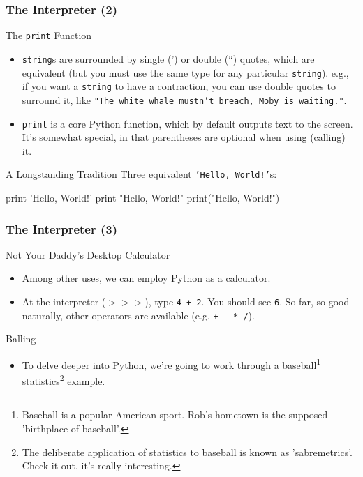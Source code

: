 \documentclass[10pt]{beamer}
\begin{document}
\begin{frame}[fragile]
  \frametitle{The Interpreter (2)}
  \begin{block}{The \texttt{print} Function}
    \begin{itemize}
      \item \texttt{string}s are surrounded by single (') or double (``) quotes, which are equivalent (but you must use the same type for any particular \texttt{string}).
        e.g., if you want a \texttt{string} to have a contraction, you can use double quotes to surround it, like \texttt{"The white whale mustn't breach, Moby is waiting."}.
      \item \texttt{print} is a core Python function, which by default outputs text to the screen. It's somewhat special, in that parentheses are optional when using (calling) it.
    \end{itemize}
  \end{block}
  \begin{block}{A Longstanding Tradition}
      Three equivalent \texttt{'Hello, World!'}s:
      \begin{pythoncode}
  print 'Hello, World!'
  print "Hello, World!"
  print("Hello, World!")
      \end{pythoncode}
  \end{block}
\end{frame}

\begin{frame}
  \frametitle{The Interpreter (3)}
  \begin{block}{Not Your Daddy's Desktop Calculator}
    \begin{itemize}
      \item Among other uses, we can employ Python as a calculator.
      \item At the interpreter (\texttt{$>>>$}), type \texttt{4 + 2}.
        You should see \texttt{6}.
        So far, so good -- naturally, other operators are available (e.g. \texttt{+ - * /}).
    \end{itemize}
  \end{block}
  \begin{block}{Balling}
    \begin{itemize}
      \item To delve deeper into Python, we're going to work through a baseball\footnote{Baseball is a popular American sport. Rob's hometown is the supposed 'birthplace of baseball'.} statistics\footnote{The deliberate application of statistics to baseball is known as 'sabremetrics'. Check it out, it's really interesting.} example.
    \end{itemize}
  \end{block}
\end{frame}
\end{document}
